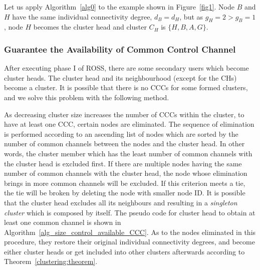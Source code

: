 \documentclass[10pt,journal,compsoc]{IEEEtran}
\theoremstyle{mytheoremstyle}
\theoremstyle{mytheoremstyle}
\theoremstyle{mytheoremstyle}
\newcommand{\ie}{i.e., }
\begin{document}
Let us apply Algorithm~\ref{alg0} to the example shown in Figure~\ref{fig1}.
Node $B$ and $H$ have the same individual connectivity degree, $d_B=d_H$, but as $g_H=2>g_B=1$, node $H$ becomes the cluster head and cluster $C_H$ is $\{H, B, A, G\}$.
	




\subsubsection{Guarantee the Availability of Common Control Channel}
After executing phase I of ROSS, there are some secondary users which become cluster heads.
The cluster head and its neighbourhood (except for the CHs) become a cluster.
It is possible that there is no CCCs for some formed clusters, and we solve this problem with the following method.

As decreasing cluster size increases the number of CCCs within the cluster, to have at least one CCC, certain nodes are eliminated.
The sequence of elimination is performed according to an ascending list of nodes which are sorted by the number of common channels between the nodes and the cluster head. 
In other words, the cluster member which has the least number of common channels with the cluster head is excluded first.
If there are multiple nodes having the same number of common channels with the cluster head, the node whose elimination brings in more common channels will be excluded.
If this criterion meets a tie, the tie will be broken by deleting the node with smaller node ID.
It is possible that the cluster head excludes all its neighbours and resulting in a \textit{singleton cluster} which is composed by itself.
The pseudo code for cluster head to obtain at least one common channel is shown in Algorithm~\ref{alg_size_control_available_CCC}.
As to the nodes eliminated in this procedure, they restore their original individual connectivity degrees, and become either cluster heads or get included into other clusters afterwards according to Theorem~\ref{clustering:theorem}.
\end{document}
